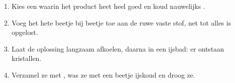 \begin{method}\label{met:g10:synthesis-yield:recrystallise}
\begin{enumerate}
  \item Kies een  waarin het product heet heel goed en koud
        nauwelijks .
  \item Voeg het hete  beetje bij beetje toe aan de ruwe
        vaste stof, net tot alles is opgelost.
  \item Laat de oplossing langzaam afkoelen, daarna in een ijsbad: er
        ontstaan kristallen.
  \item Verzamel ze met , was ze met een beetje ijskoud
         en droog ze.
\end{enumerate}
\end{method}


